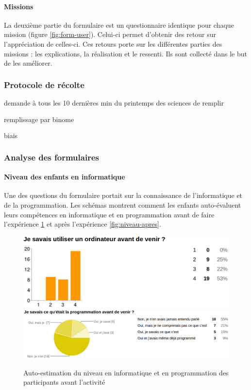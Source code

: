 \paragraph{Missions}
La deuxième partie du formulaire est un questionnaire identique pour chaque mission (figure \ref{fig:form-user}). Celui-ci permet d'obtenir des retour sur l'appréciation de celles-ci. Ces retours porte sur les différentes parties des missions : les explications, la réalisation et le ressenti. Ils sont collecté dans le but de les améliorer.

\subsubsection{Protocole de récolte}
demande à tous les 10 dernières min du printemps des sciences de remplir

remplissage par binome

biais

\subsubsection{Analyse des formulaires}

\paragraph{Niveau des enfants en informatique}
Une des questions du formulaire portait sur la connaissance de l'informatique et de la programmation. Les schémas montrent comment les enfants auto-évaluent leurs compétences en informatique et en programmation avant de faire l'expérience \ref{fig:niveau-avant} et après l'expérience \ref{fig:niveau-apres}.
\begin{figure}
  \begin{center}
    \includegraphics[width=.7\textwidth]{content/8-validation/images/avant}
    \includegraphics[width=\textwidth]{content/8-validation/images/programmation}
    \caption{Auto-estimation du niveau en informatique et en programmation des participants avant l'activité}
    \label{fig:niveau-avant}
  \end{center}
\end{figure}

